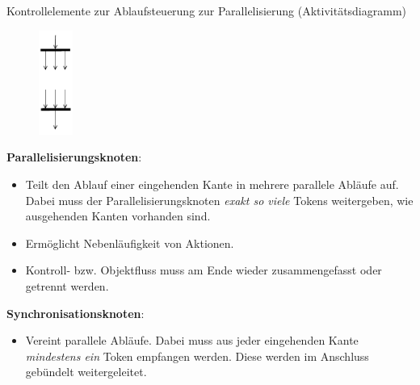 \begin{diag}{Kontrollelemente zur Ablaufsteuerung zur Parallelisierung (Aktivitätsdiagramm)}
    \begin{figure}
        \centering
        \includegraphics[width=0.1\textwidth]{includes/figures/defi_diagrams_activity_and.pdf}
    \end{figure}
    \textbf{Parallelisierungsknoten}:
    \begin{itemize}
        \item Teilt den Ablauf einer eingehenden Kante in mehrere parallele Abläufe auf.
              Dabei muss der Parallelisierungsknoten \emph{exakt so viele} Tokens weitergeben, wie ausgehenden Kanten vorhanden sind.
        \item Ermöglicht Nebenläufigkeit von Aktionen.
        \item Kontroll- bzw. Objektfluss muss am Ende wieder zusammengefasst oder getrennt werden.
    \end{itemize}

    \textbf{Synchronisationsknoten}:
    \begin{itemize}
        \item Vereint parallele Abläufe.
              Dabei muss aus jeder eingehenden Kante \emph{mindestens ein} Token empfangen werden.
              Diese werden im Anschluss gebündelt weitergeleitet.
    \end{itemize}
\end{diag}

